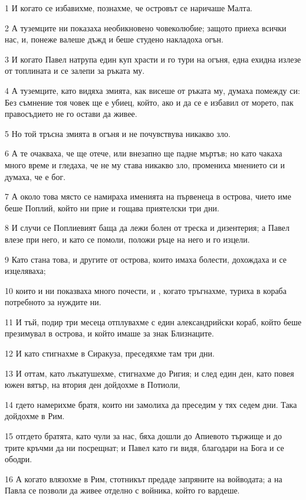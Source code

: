 \par 1 И когато се избавихме, познахме, че островът се наричаше Малта.
\par 2 А туземците ни показаха необикновено човеколюбие; защото приеха всички нас, и, понеже валеше дъжд и беше студено накладоха огън.
\par 3 И когато Павел натрупа един куп храсти и го тури на огъня, една ехидна излезе от топлината и се залепи за ръката му.
\par 4 А туземците, като видяха змията, как висеше от ръката му, думаха помежду си: Без съмнение тоя човек ще е убиец, който, ако и да се е избавил от морето, пак правосъдието не го остави да живее.
\par 5 Но той тръсна змията в огъня и не почувствува никакво зло.
\par 6 А те очакваха, че ще отече, или внезапно ще падне мъртъв; но като чакаха много време и гледаха, че не му става никакво зло, промениха мнението си и думаха, че е бог.
\par 7 А около това място се намираха именията на първенеца в острова, чието име беше Поплий, който ни прие и гощава приятелски три дни.
\par 8 И случи се Поплиевият баща да лежи болен от треска и дизентерия; а Павел влезе при него, и като се помоли, положи ръце на него и го изцели.
\par 9 Като стана това, и другите от острова, които имаха болести, дохождаха и се изцеляваха;
\par 10 които и ни показваха много почести, и , когато тръгнахме, туриха в кораба потребното за нуждите ни.
\par 11 И тъй, подир три месеца отплувахме с един александрийски кораб, който беше презимувал в острова, и който имаше за знак Близнаците.
\par 12 И като стигнахме в Сиракуза, преседяхме там три дни.
\par 13 И оттам, като лъкатушехме, стигнахме до Ригия; и след един ден, като повея южен вятър, на втория ден дойдохме в Потиоли,
\par 14 гдето намерихме братя, които ни замолиха да преседим у тях седем дни. Така дойдохме в Рим.
\par 15 отгдето братята, като чули за нас, бяха дошли до Апиевото тържище и до трите кръчми да ни посрещнат; и Павел като ги видя, благодари на Бога и се ободри.
\par 16 А когато влязохме в Рим, стотникът предаде запряните на войводата; а на Павла се позволи да живее отделно с войника, който го вардеше.
